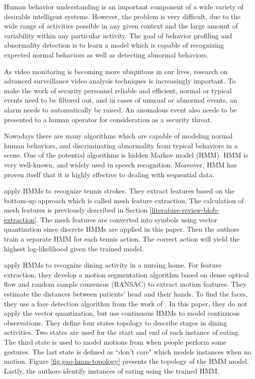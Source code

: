 Human behavior understanding is an important component of a wide
variety of desirable intelligent systems. However, the problem is very
difficult, due to the wide range of activities possible in any given
context and the large amount of variability within any particular
activity. The goal of behavior profiling and abnormality detection is
to learn a model which is capable of recognizing expected normal
behaviors as well as detecting abnormal behaviors.

As video monitoring is becoming more ubiquitous in our lives, research
on advanced surveillance video analysis techniques is increasingly
important. To make the work of security personnel reliable and
efficient, normal or typical events need to be filtered out, and in
cases of unusual or abnormal events, an alarm needs to automatically
be raised. An anomalous event also needs to be presented to a human
operator for consideration as a security threat.

Nowadays there are many algorithms which are capable of modeling
normal human behaviors, and discriminating abnormality from typical
behaviors in a scene.  One of the potential algorithms is hidden
Markov model (HMM). HMM is very well-known, and widely used in speech
recognition. Moreover, HMM has proven itself that it is highly
effective to dealing with sequential data.

 apply HMMs to recognize tennis
strokes. They extract features based on the bottom-up approach which
is called mesh feature extraction. The calculation of mesh features is
previously described in
Section \ref{literature-review-blob-extraction}. The mesh features are
converted into symbols using vector quantization since discrete HMMs
are applied in this paper. Then the authors train a separate HMM for
each tennis action. The correct action will yield the highest
log-likelihood given the trained model.

 apply HMMs to recognize dining activity in
a nursing home. For feature extraction, they develop a motion
segmentation algorithm based on dense optical flow and random sample
consensus (RANSAC) to extract motion features. They estimate the
distances between patients' head and their hands. To find the faces,
they use a face detection algorithm from the work
of . In this paper, they do not
apply the vector quantization, but use continuous HMMs to model
continuous observations. They define four states topology to describe
stages in dining activities. Two states are used for the start and end
of each instance of eating. The third state is used to model motions
from when people perform some gestures. The last state is defined as
``don't care" which models instances when no
motion. Figure \ref{fig:gao-hmm-topology} presents the topology of the
HMM model. Lastly, the authors identify instances of eating using the
trained HMM.

